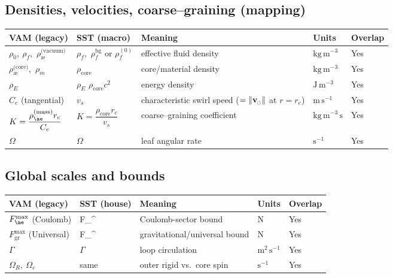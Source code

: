 \documentclass[11pt]{article}
\newcommand{\swirlarrow}{%
	\mathchoice{\mkern-2mu\scriptstyle\boldsymbol{\circlearrowleft}}%
	{\mkern-2mu\scriptstyle\boldsymbol{\circlearrowleft}}%
	{\mkern-2mu\scriptscriptstyle\boldsymbol{\circlearrowleft}}%
	{\mkern-2mu\scriptscriptstyle\boldsymbol{\circlearrowleft}}%
}
\newcommand{\vswirl}{\mathbf{v}_{\swirlarrow}}
\newcommand{\vscore}{v_s}                                %
\newcommand{\rhoF}{\rho_{\!f}}                           %
\newcommand{\rhoE}{\rho_{\!E}}                           %
\newcommand{\rhoC}{\rho_{\mathrm{core}}} %
\newcommand{\rs}{r_e}                                    %
\newcommand{\FmaxEM}{F_{\mathrm{EM}}^{\max}}             %
\newcommand{\FmaxG}{F_{\mathrm{G}}^{\max}}               %
\begin{document}
	\subsection*{Densities, velocities, coarse–graining (mapping)}
		\begin{center}
            \scriptsize
			\begin{tabular}{lllll}
				\hline
				\textbf{VAM (legacy)} & \textbf{SST (macro)} & \textbf{Meaning} & \textbf{Units} & \textbf{Overlap} \\
				\hline
				$\rho_0,\ \rho_{\scriptscriptstyle\boldsymbol\!f}$,\ $\rho_{\text{\ae}}^{\text{(vacuum)}}$ & $\rhoF$,\ $\rhoF^{\mathrm{bg}}$ or $\rhoF^{(0)}$ & effective fluid density & $\mathrm{kg\,m^{-3}}$ & Yes \\
				$\rho_{\text{\ae}}^{\text{(core)}}$,\ 	$\rho_{\scriptscriptstyle\boldsymbol\!m}$  & $\rhoC$ & core/material density & $\mathrm{kg\,m^{-3}}$ & Yes \\
				$\rho_{\scriptscriptstyle\boldsymbol\!E}$ & $\rhoE$ \text{ (or } $\rhoC c^2$\text{)} & energy density & $\mathrm{J\,m^{-3}}$ & Yes \\
                $C_e$ (tangential) & $\vscore$ & characteristic swirl speed ($=\|\vswirl\|$ at $r=\rs$) & $\mathrm{m\,s^{-1}}$ & Yes \\
                $K=\dfrac{\rho_{\ae}^{(\text{mass})} r_c}{C_e}$ & $K=\dfrac{\rhoC r_c}{\vscore}$ & coarse–graining coefficient & $\mathrm{kg\,m^{-3}\,s}$ & Yes \\
				$\Omega$ & $\Omega$ & leaf angular rate & $\mathrm{s^{-1}}$ & Yes \\
				\hline
			\end{tabular}
		\end{center}

	\subsection*{Global scales and bounds}
		\begin{center}
			\begin{tabular}{lllll}
				\hline
				\textbf{VAM (legacy)} & \textbf{SST (house)} & \textbf{Meaning} & \textbf{Units} & \textbf{Overlap} \\
				\hline
				$F_{\ae}^{\max}$ (Coulomb) & \FmaxEM & Coulomb-sector bound & $\mathrm{N}$ & Yes \\
				$F_{\mathrm{gr}}^{\max}$ (Universal) & \FmaxG & gravitational/universal bound & $\mathrm{N}$ & Yes \\
				$\Gamma$ & $\Gamma$ & loop circulation & $\mathrm{m^{2}\,s^{-1}}$ & Yes \\
				$\Omega_R,\ \Omega_c$ & same & outer rigid vs.\ core spin & $\mathrm{s^{-1}}$ & Yes \\
				\hline
			\end{tabular}
		\end{center}
\end{document}
